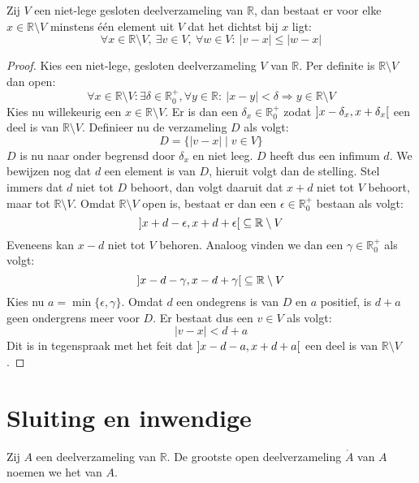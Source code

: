 \documentclass[main.tex]{subfiles}
\begin{document}
\begin{pr}
  Zij $V$ een niet-lege gesloten deelverzameling van $\mathbb{R}$, dan bestaat er voor elke $x\in \mathbb{R} \setminus V$ minstens \'e\'en element uit $V$ dat het dichtst bij $x$ ligt:
  \[ \forall x \in \mathbb{R}\setminus V,\ \exists v \in V,\ \forall w\in V:\ |v-x| \le |w-x| \]

  \begin{proof}
    Kies een niet-lege, gesloten deelverzameling $V$ van $\mathbb{R}$.
    Per definite is $\mathbb{R} \setminus V$ dan open:
    \[ \forall x\in \mathbb{R} \setminus V: \exists \delta \in \mathbb{R}_{0}^{+}, \forall y\in \mathbb{R}:\ |x-y| < \delta \Rightarrow y \in \mathbb{R}\setminus V \]
    Kies nu willekeurig een $x\in \mathbb{R}\setminus V$.
    Er is dan een $\delta_{x}\in \mathbb{R}_{0}^{+}$ zodat $\interval[open]{x-\delta_{x}}{x+\delta_{x}}$ een deel is van $\mathbb{R}\setminus V$.
    Definieer nu de verzameling $D$ als volgt:
    \[ D = \{ |v-x| \mid v \in V \} \]
    $D$ is nu naar onder begrensd door $\delta_{x}$ en niet leeg.
    $D$ heeft dus een infimum $d$. 
    We bewijzen nog dat $d$ een element is van $D$, hieruit volgt dan de stelling.
    Stel immers dat $d$ niet tot $D$ behoort, dan volgt daaruit dat $x+d$ niet tot $V$ behoort, maar tot $\mathbb{R} \setminus V$.
    Omdat $\mathbb{R} \setminus V$ open is, bestaat er dan een $\epsilon \in \mathbb{R}_{0}^{+}$ bestaan als volgt:
    \[ \interval[open]{x+d-\epsilon}{x+d+\epsilon} \subseteq \mathbb{R}\setminus V \]
    Eveneens kan $x-d$ niet tot $V$ behoren.
    Analoog vinden we dan een $\gamma\in \mathbb{R}_{0}^{+}$ als volgt:
    \[ \interval[open]{x-d-\gamma}{x-d+\gamma} \subseteq \mathbb{R}\setminus V \]
    Kies nu $a=\min\{\epsilon,\gamma\}$.
    Omdat $d$ een ondegrens is van $D$ en $a$ positief, is $d+a$ geen ondergrens meer voor $D$.
    Er bestaat dus een $v\in V$ als volgt:
    \[ |v-x| < d+a \]
    Dit is in tegenspraak met het feit dat $\interval[open]{x-d-a}{x+d+a}$ een deel is van $\mathbb{R}\setminus V$.
  \end{proof}
\feed
\end{pr}


\section{Sluiting en inwendige}
\label{sec:sluit-en-inwend}

\begin{de}
  Zij $A$ een deelverzameling van $\mathbb{R}$.
  De grootste open deelverzameling $\mathring{A}$ van $A$ noemen we het  van $A$.
\end{de}
\end{document}
